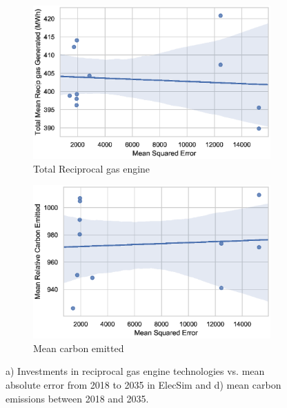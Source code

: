 \begin{figure}
	\centering
	\begin{subfigure}{0.33\textwidth}   
		\includegraphics[width=\columnwidth]{Chapter5/figures/market-forecasting/results/elecsim_results/results_2/total_Recip_gas_mean_output.eps}
		\caption{Total Reciprocal gas engine}
		\label{fig:total_Recip_gas_mean_output.eps}
	\end{subfigure}
	\hfil
	\begin{subfigure}{0.33\textwidth}   
		\includegraphics[width=\columnwidth]{Chapter5/figures/market-forecasting/results/elecsim_results/results_2/Carbon_emitted_mean_output.eps}
		\caption{Mean carbon emitted}
		\label{fig:Carbon_emitted_mean_output}
	\end{subfigure}
	\label{fig:nuclear_pv_carbon_totals}
	\caption{a) Investments in reciprocal gas engine technologies vs. mean absolute error from 2018 to 2035 in ElecSim and d) mean carbon emissions between 2018 and 2035.}
\end{figure}






